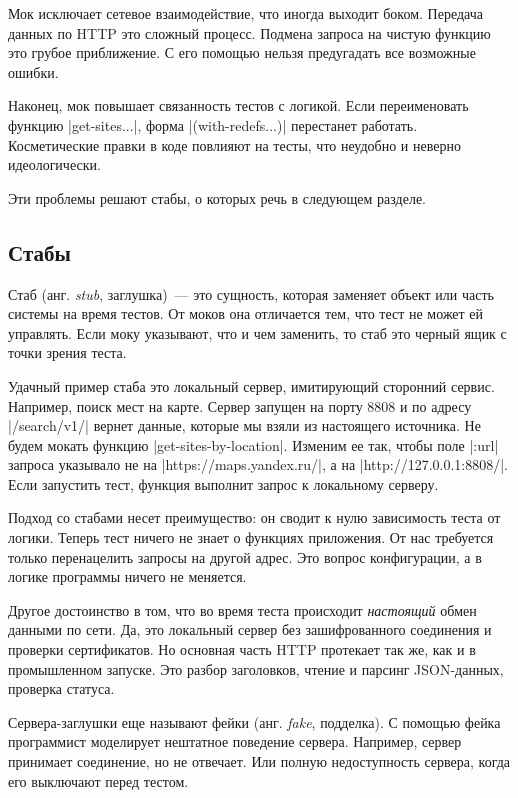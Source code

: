 Мок исключает сетевое взаимодействие, что иногда выходит боком. Передача данных
по HTTP это сложный процесс. Подмена запроса на чистую функцию это грубое
приближение. С его помощью нельзя предугадать все возможные ошибки.

Наконец, мок повышает связанность тестов с логикой. Если переименовать функцию
\spverb|get-sites...|, форма \spverb|(with-redefs...)| перестанет
работать. Косметические правки в коде повлияют на тесты, что неудобно и неверно
идеологически.

Эти проблемы решают стабы, о которых речь в следующем разделе.

\subsection{Стабы}

Стаб (анг. \emph{stub}, заглушка)~--- это сущность, которая заменяет объект или
часть системы на время тестов. От моков она отличается тем, что тест не может ей
управлять. Если моку указывают, что и чем заменить, то стаб это черный ящик с
точки зрения теста.

Удачный пример стаба это локальный сервер, имитирующий сторонний сервис.
Например, поиск мест на карте. Сервер запущен на порту 8808 и по адресу
\spverb|/search/v1/| вернет данные, которые мы взяли из настоящего источника. Не
будем мокать функцию \spverb|get-sites-by-location|. Изменим ее так, чтобы поле
\spverb|:url| запроса указывало не на \spverb|https://maps.yandex.ru/|, а на
\spverb|http://127.0.0.1:8808/|. Если запустить тест, функция выполнит запрос к
локальному серверу.

Подход со стабами несет преимущество: он сводит к нулю зависимость теста от
логики. Теперь тест ничего не знает о функциях приложения. От нас требуется
только перенацелить запросы на другой адрес. Это вопрос конфигурации, а в логике
программы ничего не меняется.

Другое достоинство в том, что во время теста происходит \emph{настоящий} обмен
данными по сети. Да, это локальный сервер без зашифрованного соединения и
проверки сертификатов. Но основная часть HTTP протекает так же, как и в
промышленном запуске. Это разбор заголовков, чтение и парсинг JSON-данных,
проверка статуса.

Сервера-заглушки еще называют фейки (анг. \emph{fake}, подделка). С помощью
фейка программист моделирует нештатное поведение сервера. Например, сервер
принимает соединение, но не отвечает. Или полную недоступность сервера, когда
его выключают перед тестом.


